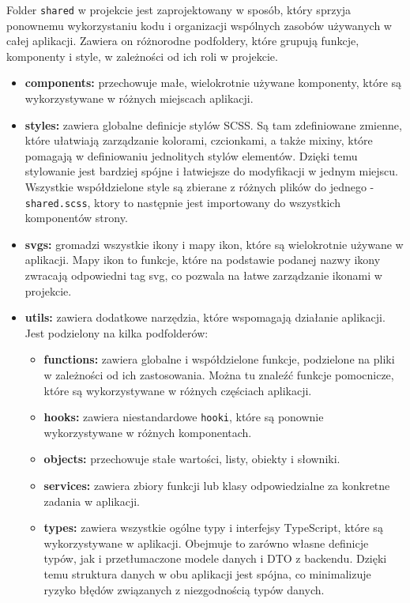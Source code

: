 \documentclass[twoside]{projektInzynierskiMS1}
\begin{document}
\newpage

\noindent
Folder \texttt{shared} w projekcie jest zaprojektowany w sposób, który sprzyja ponownemu wykorzystaniu kodu i organizacji wspólnych zasobów używanych w całej aplikacji. Zawiera on różnorodne podfoldery, które grupują funkcje, komponenty i style, w zależności od ich roli w projekcie.

\begin{itemize}
    \item \textbf{components:} przechowuje małe, wielokrotnie używane komponenty, które są wykorzystywane w różnych miejscach aplikacji.
    \item \textbf{styles:} zawiera globalne definicje stylów SCSS. Są tam zdefiniowane zmienne, które ułatwiają zarządzanie kolorami, czcionkami, a także mixiny, które pomagają w definiowaniu jednolitych stylów elementów. Dzięki temu stylowanie jest bardziej spójne i łatwiejsze do modyfikacji w jednym miejscu. Wszystkie współdzielone style są zbierane z różnych plików do jednego - \texttt{shared.scss}, ktory to następnie jest importowany do wszystkich komponentów strony.
    \item \textbf{svgs:} gromadzi wszystkie ikony i mapy ikon, które są wielokrotnie używane w aplikacji. Mapy ikon to funkcje, które na podstawie podanej nazwy ikony zwracają odpowiedni tag svg, co pozwala na łatwe zarządzanie ikonami w projekcie.
    \item \textbf{utils:} zawiera dodatkowe narzędzia, które wspomagają działanie aplikacji. Jest podzielony na kilka podfolderów:
    \begin{itemize}
        \item \textbf{functions:} zawiera globalne i współdzielone funkcje, podzielone na pliki w zależności od ich zastosowania. Można tu znaleźć funkcje pomocnicze, które są wykorzystywane w różnych częściach aplikacji.
        \item \textbf{hooks:} zawiera niestandardowe \texttt{hooki}, które są ponownie wykorzystywane w różnych komponentach.
        \item \textbf{objects:} przechowuje stałe wartości, listy, obiekty i słowniki.
        \item \textbf{services:} zawiera zbiory funkcji lub klasy odpowiedzialne za konkretne zadania w aplikacji.
        \item \textbf{types:} zawiera wszystkie ogólne typy i interfejsy TypeScript, które są wykorzystywane w aplikacji. Obejmuje to zarówno własne definicje typów, jak i przetłumaczone modele danych i DTO z backendu. Dzięki temu struktura danych w obu aplikacji jest spójna, co minimalizuje ryzyko błędów związanych z niezgodnością typów danych.
    \end{itemize}
\end{itemize}
\end{document}
